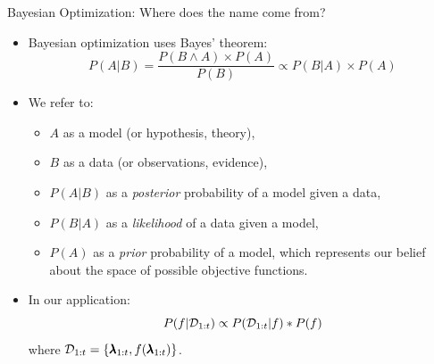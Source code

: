 \begin{frame}[c]{Bayesian Optimization: Where does the name come from?}

\begin{itemize}
    \item Bayesian optimization uses Bayes' theorem: 
    	\begin{equation*}
    	    P(A \vert B) = \frac{P(B \wedge A) \times  P(A)}{P(B)}
    	    \propto P(B \vert A) \times  P(A)
    	\end{equation*} \pause
    \item We refer to:
        \begin{itemize}
            \item $A$ as a model (or hypothesis, theory), 
            \item $B$ as a data (or observations, evidence),
            \item $P(A \vert B)$ as a \emph{posterior} probability of a model given a data,
            \item $P(B \vert A)$ as a \emph{likelihood} of a data given a model, 
            \item $P(A)$ as a \emph{prior} probability of a model, which represents our belief about the space of possible objective functions. 
        \end{itemize}
    \item In our application:
        \begin{equation*}
            P(f \vert \mathcal{D}_{1:t}) \propto P(\mathcal{D}_{1:t} \vert f) * P(f)
        \end{equation*} 
        where $\mathcal{D}_{1:t} = \left \{ \pmb{\lambda}_{1:t}, f(\pmb{\lambda}_{1:t}) \right \}$.

\end{itemize}

        
\end{frame}


